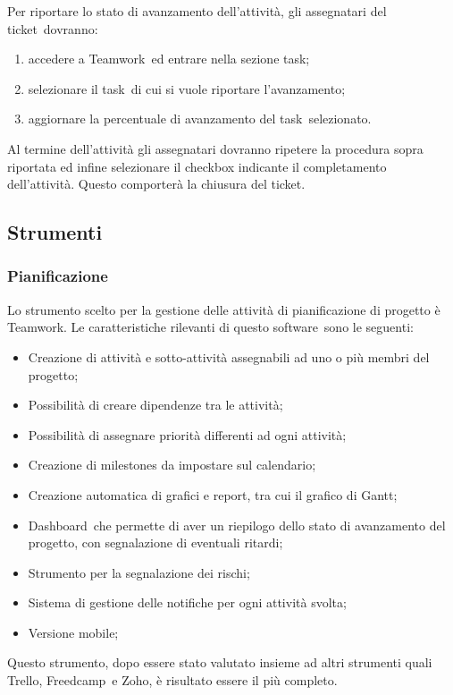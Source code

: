 \documentclass[../NormeProgetto.tex]{subfiles}
\begin{document}
			Per riportare lo stato di avanzamento dell'attività, gli assegnatari del ticket\g\ dovranno:
			\begin{enumerate}
				\item accedere a Teamwork\g\ ed entrare nella sezione task\g;
				\item selezionare il task\g\ di cui si vuole riportare l'avanzamento;
				\item aggiornare la percentuale di avanzamento del task\g\ selezionato.
			\end{enumerate}
			Al termine dell'attività gli assegnatari dovranno ripetere la procedura sopra riportata ed infine selezionare il checkbox indicante il completamento dell'attività. Questo comporterà la chiusura del ticket\g.
	\subsection{Strumenti}
			
			\subsubsection{Pianificazione} \label{sec: Pianificazione Teamwork}
			Lo strumento scelto per la gestione delle attività di pianificazione di progetto è Teamwork\g. Le caratteristiche rilevanti di questo software\g\ sono le seguenti:
			\begin{itemize}
			\item Creazione di attività e sotto-attività assegnabili ad uno o più membri del progetto;
			\item Possibilità di creare dipendenze tra le attività;
			\item Possibilità di assegnare priorità differenti ad ogni attività;
			\item Creazione di milestones da impostare sul calendario;
			\item Creazione automatica di grafici e report, tra cui il grafico di Gantt;
			\item Dashboard\g\ che permette di aver un riepilogo dello stato di avanzamento del progetto, con segnalazione di eventuali ritardi;
			\item Strumento per la segnalazione dei rischi;
			\item Sistema di gestione delle notifiche per ogni attività svolta;
			\item Versione mobile;
			\end{itemize}		 
	Questo strumento, dopo essere stato valutato insieme ad altri strumenti quali Trello, Freedcamp\g\ e Zoho, è risultato essere il più completo.
			
\end{document}
